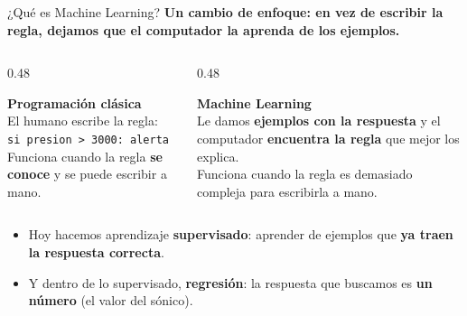 \documentclass[aspectratio=169, 11pt]{beamer}
\begin{document}
\begin{frame}[shrink=10]{¿Qué es Machine Learning?}
  \vspace{-6pt}
  {\small\color{arcaDark}\bfseries
    Un cambio de enfoque: en vez de escribir la regla, dejamos que el computador la \textbf{aprenda} de los ejemplos.}

  \vspace{10pt}
  \begin{columns}[T]
    \begin{column}{0.48\textwidth}
      \begin{tcolorbox}[colback=arcaGray, colframe=textMuted, boxrule=0pt, leftrule=3pt,
        arc=3pt, left=6pt, right=6pt, top=5pt, bottom=5pt]
        {\scriptsize\color{textDark}\bfseries\faCode\hspace{4pt}Programación clásica}\\[4pt]
        {\scriptsize\color{textMuted}
          El humano escribe la regla:\\[2pt]
          \texttt{si presion > 3000: alerta}\\[4pt]
          Funciona cuando la regla \textbf{se conoce}
          y se puede escribir a mano.}
      \end{tcolorbox}
    \end{column}
    \begin{column}{0.48\textwidth}
      \begin{tcolorbox}[colback=arcaGray, colframe=arcaRed, boxrule=0pt, leftrule=3pt,
        arc=3pt, left=6pt, right=6pt, top=5pt, bottom=5pt]
        {\scriptsize\color{arcaRed}\bfseries\faRobot\hspace{4pt}Machine Learning}\\[4pt]
        {\scriptsize\color{textMuted}
          Le damos \textbf{ejemplos con la respuesta}
          y el computador \textbf{encuentra la regla}
          que mejor los explica.\\[4pt]
          Funciona cuando la regla es demasiado
          compleja para escribirla a mano.}
      \end{tcolorbox}
    \end{column}
  \end{columns}

  \vspace{10pt}
  {\footnotesize\color{textMuted}
  \begin{itemize}\setlength{\itemsep}{4pt}
    \item[{\color{arcaRed}\scriptsize\faArrowRight}]
      Hoy hacemos aprendizaje \textbf{supervisado}: aprender de ejemplos que
      \textbf{ya traen la respuesta correcta}.
    \item[{\color{arcaRed}\scriptsize\faArrowRight}]
      Y dentro de lo supervisado, \textbf{regresión}: la respuesta que buscamos
      es \textbf{un número} (el valor del sónico).
  \end{itemize}
  }
\end{frame}
\end{document}
